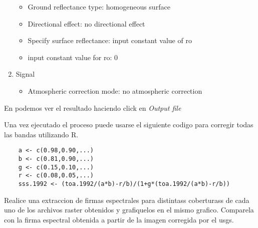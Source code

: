 \documentclass[a4paper]{article}
\begin{document}
\begin{enumerate}
        \begin{itemize}
            \item Ground reflectance type: homogeneous surface
            \item Directional effect: no directional effect
            \item Specify surface reflectance: input constant value of ro
            \item input constant value for ro: 0
        \end{itemize}
    \item Signal
        \begin{itemize}
            \item Atmospheric correction mode: no atmospheric correction
        \end{itemize}
\end{enumerate}

En  podemos ver el resultado haciendo click en \emph{Output
file}

Una vez ejecutado el proceso puede usarse el siguiente codigo para corregir
todas las bandas utilizando R.

\begin{lstlisting}
    a <- c(0.98,0.90,...)
    b <- c(0.81,0.90,...)
    g <- c(0.15,0.10,...)
    r <- c(0.08,0.05,...)
    sss.1992 <- (toa.1992/(a*b)-r/b)/(1+g*(toa.1992/(a*b)-r/b))
\end{lstlisting}



\begin{act}
    Realice una extraccion de firmas espectrales para distintass coberturass de
    cada uno de los archivos raster obtenidos y grafiquelos en el mismo grafico.
    Comparela con la firma espectral obtenida a partir de la imagen corregida
    por el usgs.
\end{act}
\end{document}
